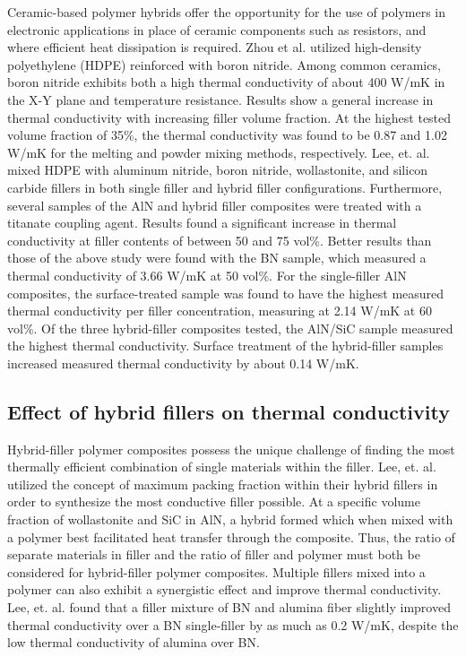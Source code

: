 \documentclass[11pt]{article}
\begin{document}
\begin{multicols}{2}
Ceramic-based polymer hybrids offer the opportunity for the use of
polymers in electronic applications in place of ceramic components such
as resistors, and where efficient heat dissipation is required. Zhou et
al. utilized high-density polyethylene (HDPE) reinforced with boron
nitride. Among common ceramics, boron nitride exhibits both a high
thermal conductivity of about 400 W/mK in the X-Y plane and temperature
resistance. Results show a general increase in thermal conductivity with
increasing filler volume fraction. At the highest tested volume fraction
of 35\%, the thermal conductivity was found to be 0.87 and 1.02 W/mK for
the melting and powder mixing methods, respectively.\cite{Zhou-2007-1863}  Lee, et.
al. mixed HDPE with aluminum nitride, boron nitride, wollastonite, and
silicon carbide fillers in both single filler and hybrid filler
configurations. Furthermore, several samples of the AlN and hybrid
filler composites were treated with a titanate coupling agent. Results
found a significant increase in thermal conductivity at filler contents
of between 50 and 75 vol\%. Better results than those of the above study
were found with the BN sample, which measured a thermal conductivity of
3.66 W/mK at 50 vol\%. For the single-filler AlN composites, the
surface-treated sample was found to have the highest measured thermal
conductivity per filler concentration, measuring at 2.14 W/mK at 60
vol\%. Of the three hybrid-filler composites tested, the AlN/SiC sample
measured the highest thermal conductivity. Surface treatment of the
hybrid-filler samples increased measured thermal conductivity by about
0.14 W/mK.\cite{Lee-2006-727}

\subsection{Effect of hybrid fillers on thermal conductivity}

Hybrid-filler polymer composites possess the unique challenge of finding
the most thermally efficient combination of single materials within the
filler. Lee, et. al. utilized the concept of maximum packing fraction
within their hybrid fillers in order to synthesize the most conductive
filler possible. At a specific volume fraction of wollastonite and SiC
in AlN, a hybrid formed which when mixed with a polymer best facilitated
heat transfer through the composite. Thus, the ratio of separate
materials in filler and the ratio of filler and polymer must both be
considered for hybrid-filler polymer composites. Multiple fillers mixed
into a polymer can also exhibit a synergistic effect and improve thermal
conductivity. Lee, et. al. found that a filler mixture of BN and alumina
fiber slightly improved thermal conductivity over a BN single-filler by
as much as 0.2 W/mK, despite the low thermal conductivity of alumina
over BN.


\end{multicols}
\end{document}
